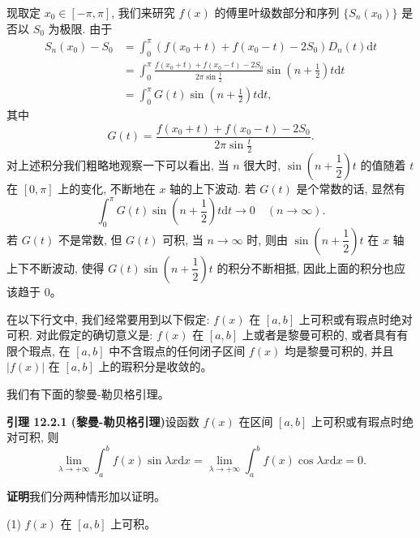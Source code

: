 \documentclass[UTF8,12pt,a4paper,fontset=fandol]{ctexart}
\begin{document}
现取定 $x_0\in[-\pi,\pi]$, 我们来研究 $f(x)$ 的傅里叶级数部分和序列 $\{S_n(x_0)\}$ 是否以 $S_0$ 为极限. 由于
\[
\begin{aligned}
  S_n(x_0)-S_0
  &=\int_0^\pi (f(x_0+t)+f(x_0-t)-2S_0)D_n(t)\mathrm dt\\
  &=\int_0^\pi\frac{f(x_0+t)+f(x_0-t)-2S_0}{2\pi\sin\frac t2}
    \sin\left(n+\frac12\right)t\mathrm dt\\
  &=\int_0^\pi G(t)\sin\left(n+\frac12\right)t\mathrm dt,
\end{aligned}
\]
其中
\begin{equation}
  G(t)=\frac{f(x_0+t)+f(x_0-t)-2S_0}{2\pi\sin\frac t2}.
  \tag{12.2.1}
\end{equation}
对上述积分我们粗略地观察一下可以看出, 当 $n$ 很大时, $\sin\left(n+\dfrac12\right)t$ 的值随着 $t$ 在 $[0,\pi]$ 上的变化, 不断地在 $x$ 轴的上下波动. 若 $G(t)$ 是个常数的话, 显然有
\[
  \int_0^\pi G(t)\sin\left(n+\frac12\right)t\mathrm dt\to0
  \quad (n\to\infty).
\]
若 $G(t)$ 不是常数, 但 $G(t)$ 可积, 当 $n\to\infty$ 时, 则由 $\sin\left(n+\dfrac12\right)t$ 在 $x$ 轴上下不断波动, 使得 $G(t)\sin\left(n+\dfrac12\right)t$ 的积分不断相抵, 因此上面的积分也应该趋于 $0$。

在以下行文中, 我们经常要用到以下假定: $f(x)$ 在 $[a,b]$ 上可积或有瑕点时绝对可积. 对此假定的确切意义是: $f(x)$ 在 $[a,b]$ 上或者是黎曼可积的, 或者具有有限个瑕点, 在 $[a,b]$ 中不含瑕点的任何闭子区间 $f(x)$ 均是黎曼可积的, 并且 $|f(x)|$ 在 $[a,b]$ 上的瑕积分是收敛的。

我们有下面的黎曼-勒贝格引理。

\noindent\textbf{引理 12.2.1 (黎曼-勒贝格引理)}\quad 设函数 $f(x)$ 在区间 $[a,b]$ 上可积或有瑕点时绝对可积, 则
\[
  \lim_{\lambda\to+\infty}\int_a^b f(x)\sin\lambda x\mathrm dx
  =\lim_{\lambda\to+\infty}\int_a^b f(x)\cos\lambda x\mathrm dx=0.
\]

\noindent\textbf{证明}\quad 我们分两种情形加以证明。

(1) $f(x)$ 在 $[a,b]$ 上可积。
\end{document}
